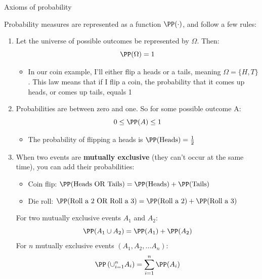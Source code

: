 \begin{frame}{Axioms of probability}

Probability measures are represented as a function $\PP(\cdot)$, and follow a few rules:
\begin{enumerate}
    \item Let the universe of possible outcomes be represented by $\Omega$. Then:
    \begin{equation*}
        \PP (\Omega) = 1
    \end{equation*}
    \pause
    \begin{itemize}
        \item[$\implies$] In our coin example, I'll either flip a heads or a tails, meaning $\Omega = \{H, T\}$. This law means that if I flip a coin, the probability that it comes up heads, or comes up tails, equals 1
    \end{itemize}
    \pause
    \item Probabilities are between zero and one. So for some possible outcome A:
    \begin{equation*}
        0 \leq \PP (A) \leq 1
    \end{equation*}
    \pause
    \begin{itemize}
        \item[$\implies$] The probability of flipping a heads is $\PP (\text{Heads}) = \frac{1}{2}$
    \end{itemize}

    \pause
    \item When two events are \textbf{mutually exclusive} (they can't occur at the same time), you can add their probabilities:
    \pause
    \begin{itemize}
        \item Coin flip: $\PP (\text{Heads OR Tails}) = \PP (\text{Heads}) + \PP (\text{Tails}) $
        \item Die roll: $\PP (\text{Roll a 2 OR Roll a 3}) = \PP (\text{Roll a 2}) + \PP(\text{Roll a 3})$
    \end{itemize}

    For two mutually exclusive events $A_1$ and $A_2$:
    \begin{equation*}
        \PP (A_1 \cup A_2) = \PP (A_1) + \PP (A_2)
    \end{equation*}
    For $n$ mutually exclusive events $(A_1, A_2, \dots A_n)$:
    \begin{equation*}
        \PP \left( \cup_{i=1}^n A_i \right) = \sum_{i=1}^n \PP (A_i)
    \end{equation*}
    
\end{enumerate}

\end{frame}

